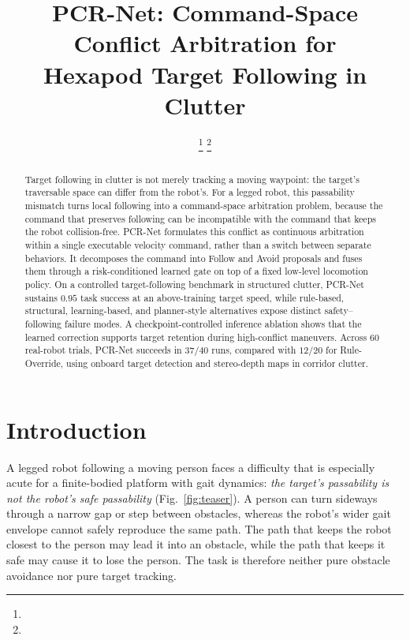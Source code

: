 \documentclass[letterpaper, 10 pt, conference]{ieeeconf}
\begin{document}
\title{\LARGE \bf
PCR-Net: Command-Space Conflict Arbitration for\\
Hexapod Target Following in Clutter}
\author{
\thanks{}%
\thanks{}}
\maketitle
\thispagestyle{empty}
\pagestyle{empty}

\begin{abstract}
Target following in clutter is not merely tracking a moving waypoint: the
target's traversable space can differ from the robot's. For a legged robot,
this passability mismatch turns local following into a command-space
arbitration problem, because the command that preserves following can
be incompatible with the command that keeps the robot collision-free.
PCR-Net formulates this conflict as continuous arbitration within a single
executable velocity command, rather than a switch between separate behaviors.
It decomposes the command into Follow and Avoid proposals and fuses them
through a risk-conditioned learned gate on top of a fixed low-level locomotion
policy. On a controlled target-following benchmark in structured clutter,
PCR-Net sustains $0.95$ task success at an above-training target speed,
while rule-based, structural, learning-based, and planner-style alternatives expose
distinct safety--following failure modes. A checkpoint-controlled inference
ablation shows that the learned correction supports target
retention during high-conflict maneuvers. Across $60$ real-robot trials,
PCR-Net succeeds in $37/40$ runs, compared with $12/20$ for Rule-Override,
using onboard target detection and stereo-depth maps in corridor clutter.
\end{abstract}

\section{Introduction}
A legged robot following a moving person faces a difficulty that is
especially acute for a finite-bodied platform with gait dynamics:
\emph{the target's passability is not the robot's safe passability}
(Fig.~\ref{fig:teaser}). A person can turn sideways through a narrow gap or
step between obstacles, whereas the robot's wider gait envelope cannot safely
reproduce the same path. The path that keeps the robot closest to the person may lead
it into an obstacle, while the path that keeps it safe may cause it to
lose the person. The task is therefore neither pure obstacle avoidance
nor pure target tracking.
\end{document}

